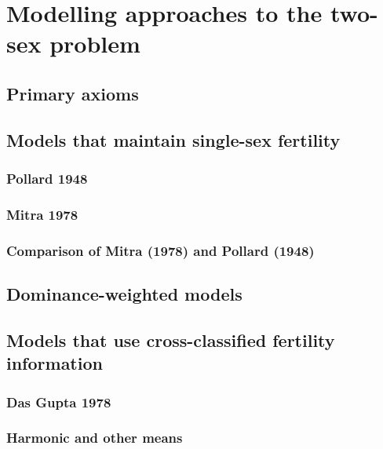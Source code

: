 \chapter{Modelling approaches to the two-sex problem}
  

  \section{Primary axioms}
    
    
  \section{Models that maintain single-sex fertility}
  
     \subsection{Pollard 1948}
       
     \subsection{Mitra 1978}
       
       
     \subsection{Comparison of Mitra (1978) and Pollard (1948)}
       
       
  \section{Dominance-weighted models}
     
  \section{Models that use cross-classified fertility information}
     \subsection{Das Gupta 1978}
       
     \subsection{Harmonic and other means}
       
     

